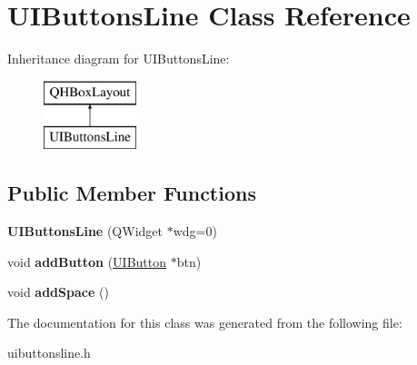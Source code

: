 \hypertarget{class_u_i_buttons_line}{}\section{U\+I\+Buttons\+Line Class Reference}
\label{class_u_i_buttons_line}
Inheritance diagram for U\+I\+Buttons\+Line\+:\begin{figure}[H]
\begin{center}
\leavevmode
\includegraphics[height=2.000000cm]{class_u_i_buttons_line}
\end{center}
\end{figure}
\subsection*{Public Member Functions}
\begin{DoxyCompactItemize}
\item 
{\bfseries U\+I\+Buttons\+Line} (Q\+Widget $\ast$wdg=0)\hypertarget{class_u_i_buttons_line_a53d30e19ee72124286ec9b6a2d6e15f0}{}\label{class_u_i_buttons_line_a53d30e19ee72124286ec9b6a2d6e15f0}

\item 
void {\bfseries add\+Button} (\hyperlink{class_u_i_button}{U\+I\+Button} $\ast$btn)\hypertarget{class_u_i_buttons_line_a464c6748e2a71bd7bc5af566ba934ac0}{}\label{class_u_i_buttons_line_a464c6748e2a71bd7bc5af566ba934ac0}

\item 
void {\bfseries add\+Space} ()\hypertarget{class_u_i_buttons_line_a273a60c36299815ce2dd280471f881a1}{}\label{class_u_i_buttons_line_a273a60c36299815ce2dd280471f881a1}

\end{DoxyCompactItemize}


The documentation for this class was generated from the following file\+:\begin{DoxyCompactItemize}
\item 
uibuttonsline.\+h\end{DoxyCompactItemize}
